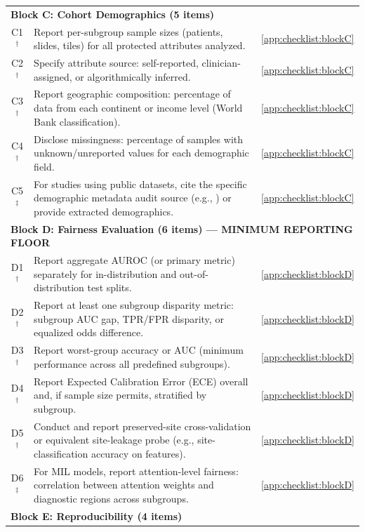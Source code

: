 \begin{table}[htbp]
\begin{tabularx}{\linewidth}{@{}c p{10.5cm} X@{}}
    \midrule
    \multicolumn{3}{l}{\textbf{Block C: Cohort Demographics (5 items)}} \\
    C1$^\dagger$ & Report per-subgroup sample sizes (patients, slides, tiles) for all protected attributes analyzed. & \ref{app:checklist:blockC} \\
    C2$^\dagger$ & Specify attribute source: self-reported, clinician-assigned, or algorithmically inferred. & \ref{app:checklist:blockC} \\
    C3$^\dagger$ & Report geographic composition: percentage of data from each continent or income level (World Bank classification). & \ref{app:checklist:blockC} \\
    C4$^\dagger$ & Disclose missingness: percentage of samples with unknown/unreported values for each demographic field. & \ref{app:checklist:blockC} \\
    C5$^\ddagger$ & For studies using public datasets, cite the specific demographic metadata audit source (e.g., \citet{norori2021addressing}) or provide extracted demographics. & \ref{app:checklist:blockC} \\
    \midrule
    \multicolumn{3}{l}{\textbf{Block D: Fairness Evaluation (6 items) --- MINIMUM REPORTING FLOOR}} \\
    D1$^\dagger$ & Report aggregate AUROC (or primary metric) separately for in-distribution and out-of-distribution test splits. & \ref{app:checklist:blockD} \\
    D2$^\dagger$ & Report at least one subgroup disparity metric: subgroup AUC gap, TPR/FPR disparity, or equalized odds difference. & \ref{app:checklist:blockD} \\
    D3$^\dagger$ & Report worst-group accuracy or AUC (minimum performance across all predefined subgroups). & \ref{app:checklist:blockD} \\
    D4$^\dagger$ & Report Expected Calibration Error (ECE) overall and, if sample size permits, stratified by subgroup. & \ref{app:checklist:blockD} \\
    D5$^\dagger$ & Conduct and report preserved-site cross-validation or equivalent site-leakage probe (e.g., site-classification accuracy on features). & \ref{app:checklist:blockD} \\
    D6$^\ddagger$ & For MIL models, report attention-level fairness: correlation between attention weights and diagnostic regions across subgroups. & \ref{app:checklist:blockD} \\
    \midrule
    \multicolumn{3}{l}{\textbf{Block E: Reproducibility (4 items)}} \\

\end{tabularx}
\end{table}
